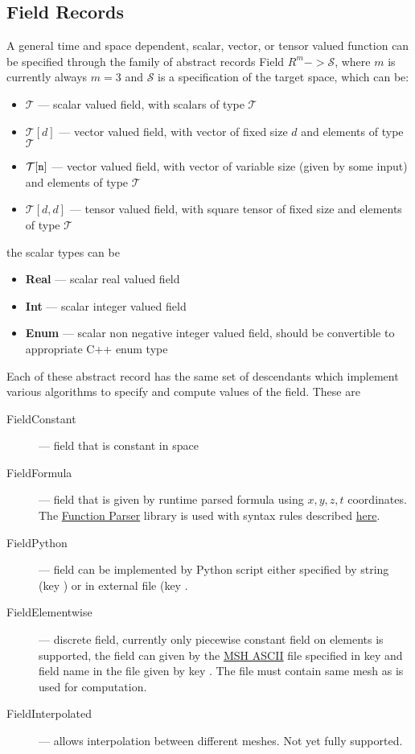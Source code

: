 \subsection{Field Records}
\label{sec:Fields}
A general time and space dependent, scalar, vector, or  tensor valued function can be specified through the family of abstract records 
Field $R^m -> \mathcal{S}$, where $m$ is currently always $m=3$ and $\mathcal{S}$ is a specification of the target space, which can be:
\begin{itemize}
 \item {\bf $\mathcal{T}$} --- scalar valued field, with scalars of type $\mathcal{T}$
 \item {\bf $\mathcal{T}[d]$} --- vector valued field, with vector of fixed size $d$ and elements of type $\mathcal{T}$
 \item {\bf $\mathcal{T}[\tt n]$} --- vector valued field, with vector of variable size (given by some input) and elements of type $\mathcal{T}$
 \item {\bf $\mathcal{T}[d, d]$} --- tensor valued field, with square tensor of fixed size and elements of type $\mathcal{T}$
\end{itemize}
the scalar types can be
\begin{itemize}
 \item {\bf Real} --- scalar real valued field
 \item {\bf Int}  --- scalar integer valued field
 \item {\bf Enum} --- scalar non negative integer valued field, should be convertible to appropriate C++ enum type
\end{itemize}

Each of these abstract record has the same set of descendants which implement various algorithms to specify and compute values of the field. These are
\begin{description}
 \item[FieldConstant] --- field that is constant in space
 \item[FieldFormula] --- field that is given by runtime parsed formula using $x,y,z,t$ coordinates. The \href{http://warp.povusers.org/FunctionParser/}{Function Parser} library is used
 with syntax rules described \href{http://warp.povusers.org/FunctionParser/fparser.html#literals}{here}.
 \item[FieldPython] --- field can be implemented by Python script either specified by string (key ) 
 or in external file (key . 
 \item[FieldElementwise] --- discrete field, currently only piecewise constant field on elements is supported, the field can given by 
 the \href{http://geuz.org/gmsh/doc/texinfo/gmsh.html#MSH-ASCII-file-format}{MSH ASCII} file specified in key  and field name in the file given 
 by key . The file must contain same mesh as is used for computation.
 \item[FieldInterpolated] --- allows interpolation between different meshes. Not yet fully supported.
\end{description}


